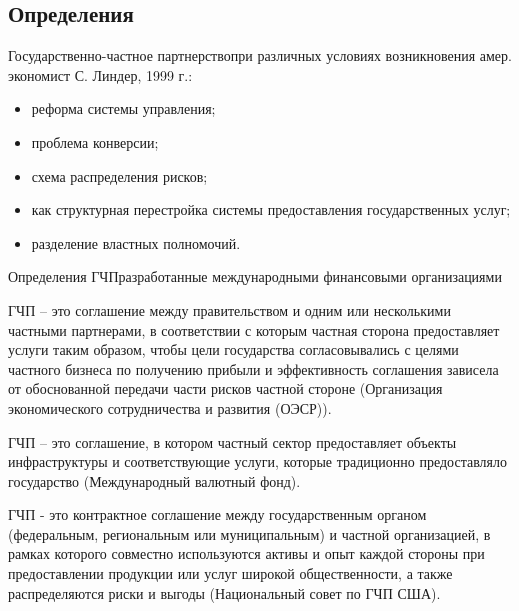\documentclass[_Venture_p3.tex]{subfiles}
\begin{document}

\subsection{Определения}
\begin{frame}[shrink=5]{Государственно-частное партнерство}{при различных условиях возникновения}
амер. экономист С. Линдер, 1999 г.:
\begin{itemize}
	\item реформа системы управления;
	\item проблема конверсии;
	\item схема распределения рисков;
	\item как структурная перестройка системы предоставления государственных услуг;
	\item разделение властных полномочий.
\end{itemize}
\end{frame}

\begin{frame}[allowframebreaks]{Определения ГЧП}{разработанные международными финансовыми организациями}
\begin{block}{ГЧП}
	\quad
	– это соглашение между правительством и одним или несколькими частными партнерами, в соответствии с которым частная сторона предоставляет услуги таким образом, чтобы цели государства согласовывались с целями частного бизнеса по получению прибыли и эффективность соглашения зависела от обоснованной передачи части рисков частной стороне (Организация экономического сотрудничества и развития (ОЭСР)).
\end{block}

\pagebreak


\begin{block}{ГЧП}
	\quad
	– это соглашение, в котором частный сектор предоставляет объекты инфраструктуры и соответствующие услуги, которые традиционно предоставляло государство (Международный валютный фонд).
\end{block}

\pagebreak


\begin{block}{ГЧП}
	\quad
	- это контрактное соглашение между государственным органом (федеральным, региональным или муниципальным) и частной организацией, в рамках которого совместно используются активы и опыт каждой стороны при предоставлении продукции или услуг широкой общественности, а также распределяются риски и выгоды (Национальный совет по ГЧП США).
\end{block}
\end{frame}
\end{document}
